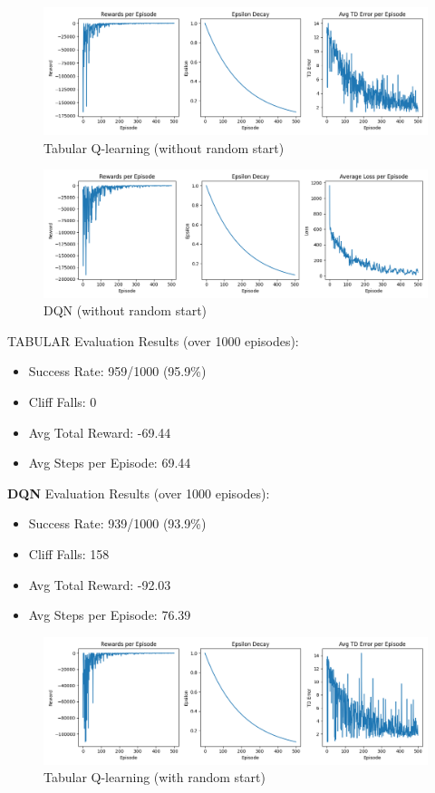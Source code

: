 \documentclass[a4paper,12pt]{article}
\begin{document}
\begin{figure}[H]
    \centering
    \includegraphics[width=\linewidth]{1_32_0995_64_slip_tab.png}
    \caption{Tabular Q-learning (without random start)}
\end{figure}
\begin{figure}[H]
    \centering
    \includegraphics[width=\linewidth]{1_32_0995_64_slip_dqn.png}
    \caption{DQN (without random start)}
\end{figure}
\noindent TABULAR Evaluation Results (over 1000 episodes):
\begin{itemize}
    \item Success Rate: 959/1000 (95.9\%)
    \item Cliff Falls: 0
    \item Avg Total Reward: -69.44
    \item Avg Steps per Episode: 69.44
\end{itemize}
\textbf{DQN} Evaluation Results (over 1000 episodes):
\begin{itemize}
    \item Success Rate: 939/1000 (93.9\%)
    \item Cliff Falls: 158
    \item Avg Total Reward: -92.03
    \item Avg Steps per Episode: 76.39
\end{itemize}
\begin{figure}[H]
    \centering
    \includegraphics[width=\linewidth]{1_32_0995_64_rand_slip_tab.png}
    \caption{Tabular Q-learning (with random start)}
\end{figure}
\end{document}

